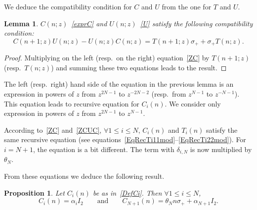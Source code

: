 \documentclass[pdftex]{sigma}%
\numberwithin{equation}{section}
\newtheorem{Lemma}[Theorem]{Lemma}
\newtheorem{Proposition}[Theorem]{Proposition}
 { \theoremstyle{definition}
\newtheorem{Definition}[Theorem]{Definition}
\newtheorem{Note}[Theorem]{Note}
\newtheorem{Example}[Theorem]{Example}
\newtheorem{problem}[Theorem]{Riemann--Hilbert Problem}
\newtheorem{Remark}[Theorem]{Remark} }
\begin{document}
	We deduce the compatibility condition for $C$ and $U$ from the one for $T$ and $U$.
	\begin{Lemma}
		$C(n;z)$~\eqref{exprC} and $U(n;z)$~\eqref{U} satisfy the following compatibility condition:
		\begin{equation}
			C(n+1;z)U(n;z)-U(n;z)C(n;z)=T(n+1;z)\sigma_++\sigma_+T(n;z).
			\label{ZCUC}
		\end{equation}
	\end{Lemma}
	\begin{proof}
		Multiplying on the left (resp.\ on the right) equation~\eqref{ZC} by $T(n+1;z)$ (resp.\ $T(n;z)$) and summing these two equations leads to the result.
	\end{proof}

The left (resp.\ right) hand side of the equation in the previous lemma is an expression in powers of $z$ from $z^{2N-1}$ to $z^{-2N-2}$ (resp.\ from $z^{N-1}$ to $z^{-N-1}$). This equation leads to recursive equation for $C_i(n)$. We consider only expression in powers of $z$ from $z^{2N-1}$ to $z^{N-1}$.

	According to~\eqref{ZC} and~\eqref{ZCUC}, $\forall 1\leqslant i\leqslant N$, $C_i(n)$ and $T_i(n)$ satisfy the same recursive equation (see equations~\eqref{EqRecTi11mod}--\eqref{EqRecTi22mod}). For $i=N+1$, the equation is a bit different. The term with $\delta_{i,N}$ is now multiplied by $\theta_N$.

	From these equations we deduce the following result.
	\begin{Proposition}
		\label{propCiHom}
		Let $C_i(n)$ be as in~\eqref{DefCi}. Then $\forall 1\leqslant i\leqslant N$,
\begin{equation*}
C_i(n)=\alpha_iI_2\qquad \text{and}\qquad
C_{N+1}(n)=\theta_Nn\sigma_++\alpha_{N+1}I_2.
\end{equation*}
\end{Proposition}
\end{document}
